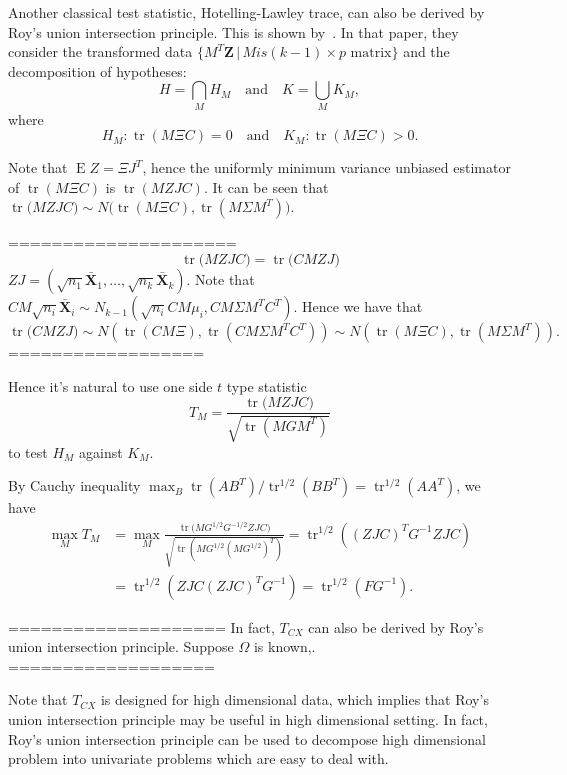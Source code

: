 \documentclass[review]{elsarticle}
\DeclareMathOperator{\mytr}{tr}
\DeclareMathOperator{\myE}{E}
\newcommand{\bZ}{\mathbf{Z}}
\newcommand{\bX}{\mathbf{X}}
\theoremstyle{plain}
\theoremstyle{definition}
\theoremstyle{remark}
\begin{document}
Another classical test statistic, Hotelling-Lawley trace,  can also be derived by Roy's union intersection principle. This is shown by~\cite{Mudholkar1974}.
 In that paper, they consider the transformed data $\{M^T \bZ\, |\, M is \text{$(k-1)\times p$ matrix}\}$ and the decomposition of hypotheses:
 $$H=\bigcap_{M}H_M \quad\text{and}\quad K=\bigcup_{M}K_M ,$$
 where
 $$
 H_M: \mytr( M \Xi C) = 0\quad \text{and}\quad K_M : \mytr( M \Xi C )> 0.
 $$

Note that $\myE Z=\Xi J^T$, hence
the uniformly minimum variance unbiased estimator of $\mytr(M\Xi C)$ is $\mytr(MZJ C)$.
It can be seen that
$
\mytr \big(MZJ C\big)
\sim
N\big(\mytr(M\Xi C),\mytr(M\Sigma M^T )\big)
$.

=====================
$$
\mytr \big(MZJC\big)
=
\mytr \big(CMZJ\big)
$$
$ZJ=(\sqrt{n_1}\bar{\bX}_1,\ldots,\sqrt{n_k}\bar{\bX}_k)$.
Note that $CM\sqrt{n_i}\bar{\bX}_i\sim N_{k-1}(\sqrt{n_i}CM\mu_i,CM\Sigma M^T C^T)$.
Hence we have that
$$
\mytr \big(CMZJ\big)
\sim
N(\mytr(CM\Xi),\mytr(CM\Sigma M^T C^T))
\sim
N(\mytr(M\Xi C),\mytr(M\Sigma M^T )).
$$
==================

Hence it's natural to use one side $t$ type statistic
$$
T_M = \frac{
\mytr \big(MZJC\big)
}{
    \sqrt{\mytr(M G M^T)}
}
$$
to test $H_M$ against $K_M$.



By Cauchy inequality $\max_B \mytr(AB^T)/\mytr^{1/2}(BB^T)=\mytr^{1/2}(AA^T)$, we have
$$
\begin{aligned}
    \max_M T_M &=\max_M \frac{\mytr \big(MG^{1/2}G^{-1/2}ZJC\big)
}{\sqrt{\mytr(M G^{1/2} (M G^{1/2})^T)}
}
    =\mytr^{1/2}((ZJC)^T G^{-1}ZJC)\\
    &=\mytr^{1/2}( ZJC(ZJC)^T G^{-1})
    =\mytr^{1/2}(F G^{-1}).
\end{aligned}
$$

====================
In fact, $T_{CX}$ can also be derived by Roy's union intersection principle.
Suppose $\Omega$ is known,.
===================

Note that $T_{CX}$ is designed for high dimensional data, which implies that Roy's union intersection principle may be useful in high dimensional setting.
In fact, Roy's union intersection principle can be used to decompose high dimensional problem into univariate problems which are easy to deal with.
\end{document}
